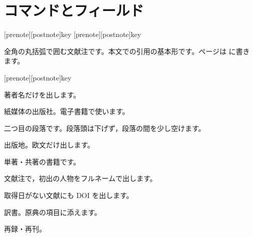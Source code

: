 \section{コマンドとフィールド}
\begin{ltxsyntax}
[prenote][postnote]{key}
[prenote][postnote]{key}

全角の丸括弧で囲む文献注です。本文での引用の基本形です。ページは  に書きます。

[prenote][postnote]{key}

著者名だけを出します。
\end{ltxsyntax}
\begin{fieldlist}

紙媒体の出版社。電子書籍で使います。

二つ目の段落です。段落頭は下げず，段落の間を少し空けます。

出版地。欧文だけ出します。
\end{fieldlist}
\begin{typelist}

単著・共著の書籍です。

\end{typelist}
\begin{optionlist}

文献注で，初出の人物をフルネームで出します。

取得日がない文献にも DOI を出します。
\end{optionlist}
\begin{keymarglist}
\item[translationof] 訳書。原典の項目に添えます。
\item[reprintof] 再録・再刊。
\end{keymarglist}
